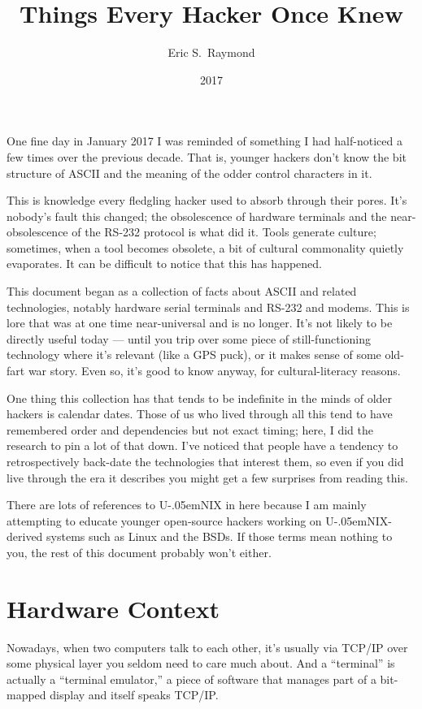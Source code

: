 \documentclass[10pt]{article}
\title{Things Every Hacker Once Knew}
\author{Eric S.~Raymond}
\date{2017}
\newcommand{\mc}{\small}
\newcommand{\acro}[1]{{\mc #1\spacefactor1000}}
\def\UNIX/{{\mc U\kern-.05emNIX\spacefactor1000}}%
\def\ASCII/{\acro{ASCII}}%
\def\RSTTT/{\acro{RS-232}}%
\begin{document}
\maketitle
\tableofcontents

\pagebreak

\noindent One fine day in January 2017 I was reminded of something I had half-noticed a
few times over the previous decade. That is, younger hackers don't know the bit
structure of \ASCII/ and the meaning of the odder control characters in it.

This is knowledge every fledgling hacker used to absorb through their pores.
It's nobody's fault this changed; the obsolescence of hardware terminals and
the near-obsolescence of the \RSTTT/ protocol is what did it. Tools generate
culture; sometimes, when a tool becomes obsolete, a bit of cultural commonality
quietly evaporates. It can be difficult to notice that this has happened.

This document began as a collection of facts about \ASCII/ and related
technologies, notably hardware serial terminals and \RSTTT/ and modems. This is
lore that was at one time near-universal and is no longer. It's not likely to
be directly useful today  ---  until you trip over some piece of still-functioning
technology where it's relevant (like a \acro{GPS} puck), or it makes sense of some
old-fart war story. Even so, it's good to know anyway, for cultural-literacy
reasons.

One thing this collection has that tends to be indefinite in the minds of older
hackers is calendar dates. Those of us who lived through all this tend to have
remembered order and dependencies but not exact timing; here, I did the
research to pin a lot of that down. I've noticed that people have a tendency to
retrospectively back-date the technologies that interest them, so even if you
did live through the era it describes you might get a few surprises from
reading this.

There are lots of references to \UNIX/ in here because I am mainly attempting to
educate younger open-source hackers working on \UNIX/-derived systems such as
Linux and the \acro{BSD}s. If those terms mean nothing to you, the rest of this
document probably won't either.

\section{Hardware Context}
Nowadays, when two computers talk to each other, it's usually via \acro{TCP/IP} over
some physical layer you seldom need to care much about. And a ``terminal'' is
actually a ``terminal emulator,'' a piece of software that manages part of a
bit-mapped display and itself speaks \acro{TCP/IP}.
\end{document}

